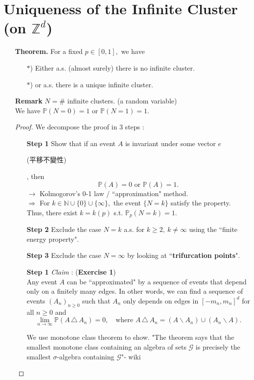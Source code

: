 \documentclass[12pt,a4paper]{report}
\theoremstyle{definition}
\newcommand{\SOL}{\fbox{ \tt s\parbox[b][2pt][c]{6pt}{o}\hspace*{-7pt} L:}}
\begin{document}
\section{Uniqueness of the Infinite Cluster (on $\mathbb{Z}^d$)}
\begin{enumerate}
	\item[\textbf{Theorem.}] For a fixed $p\in [0,1],$ we have 
	\begin{enumerate}
		\item[$*$)] Either a.s. (almost surely) there is no infinite cluster.
		\item[$*$)] or a.s. there is a unique infinite cluster.
	\end{enumerate}
	\item[\textbf{Remark}] $N=\#$ infinite clusters. (a random variable)\\
	We have $\mathbb{P}(N=0)=1$ or $\mathbb{P}(N=1)=1.$
	\begin{proof}
	We decompose the proof in 3 steps :\\
	\noindent\makebox[\linewidth]{\rule{\textwidth}{0.4pt}}
	\begin{enumerate}
		\item[\textbf{Step 1}] Show that if an event $A$ is invariant under some vector $e$ \begin{CJK}{UTF8}{bkai}(平移不變性)\end{CJK}, then 
		\[
		\mathbb{P}(A)=0\mbox{ or }\mathbb{P}(A)=1.
		\]
		$\rightarrow$ Kolmogorov's 0-1 law / ``approximation" method.\\
		$\Rightarrow$ For $k\in\mathbb{N}\cup\{0\}\cup\{\infty\},$ the event $\{N=k\}$ satisfy the property. Thus, there exist $k=k(p)$ s.t. $\mathbb{P}_p(N=k)=1.$
		\item[\textbf{Step 2}] Exclude the case $N=k$ a.s. for $k\geq 2,\ k\neq \infty$ using the ``finite energy property".
		\item[\textbf{Step 3}] Exclude the case $N=\infty$ by looking at ``\textbf{trifurcation points}".
	\end{enumerate}
	\noindent\makebox[\linewidth]{\rule{\textwidth}{0.4pt}}
	\begin{enumerate}
		\item[\textbf{Step 1}] \textit{Claim} : (\textbf{Exercise 1})\\
		Any event $A$ can be ``approximated" by a sequence of events that depend only on a finitely many edges. In other words, we can find a sequence of events $(A_n)_{n\geq 0}$ such that $A_n$ only depends on edges in $[-m_n,m_n]^d$ for all $n\geq 0$ and 
		\[
		\lim_{n\to\infty}\mathbb{P}(A\,\triangle\, A_n)=0,\quad \mbox{where } A\,\triangle\, A_n=(A\backslash A_n)\cup (A_n\backslash A).
		\]
		\item[\SOL] We use monotone class theorem to show. "The theorem says that the smallest monotone class containing an algebra of sets $\mathcal{G}$ is precisely the smallest $\sigma$-algebra containing $\mathcal{G}$"- wiki
	

\end{enumerate}
\end{proof}
\end{enumerate}
\end{document}
